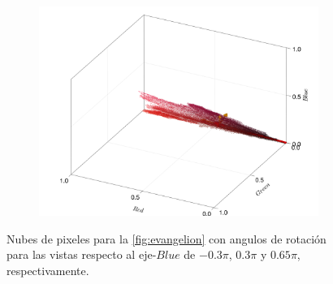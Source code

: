 \begin{figure}[ht!]
\begin{subfigure}[c]{0.3\textwidth}
    \end{subfigure}
    \begin{subfigure}[c]{0.3\textwidth}
        \centering
        \includegraphics[scale=0.09]{../figures/pixel_cloud_eva_3}
    \end{subfigure}
    \caption{Nubes de pixeles para la \cref{fig:evangelion} con angulos de rotación para las vistas respecto al eje-$Blue$ de $-0.3\pi$, $0.3\pi$ y $0.65\pi$, respectivamente.}
    \label{fig:nube-pixeles-eva}
\end{figure}

